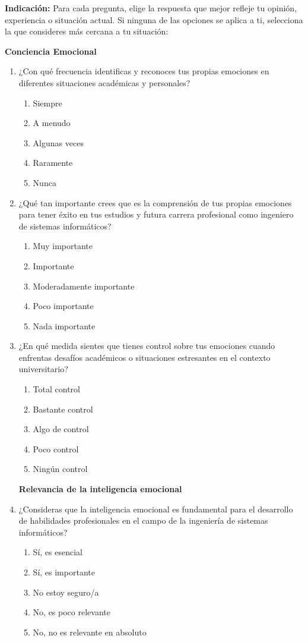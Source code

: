 \documentclass[journal]{IEEEtran}
\begin{document}
\textbf{Indicación:} Para cada pregunta, elige la respuesta que mejor refleje tu opinión, experiencia o situación actual. Si ninguna de las opciones se aplica a ti, selecciona la que consideres más cercana a tu situación:
\begin{center}
	\textbf{Conciencia Emocional}
\end{center}
\begin{enumerate}
	\item ¿Con qué frecuencia identificas y reconoces tus propias emociones en diferentes situaciones académicas y personales?
	\begin{enumerate}
		\item Siempre
		\item A menudo
		\item Algunas veces
		\item Raramente
		\item Nunca
	\end{enumerate}
	
	\item ¿Qué tan importante crees que es la comprensión de tus propias emociones para tener éxito en tus estudios y futura carrera profesional como ingeniero de sistemas informáticos?
	\begin{enumerate}
		\item Muy importante
		\item Importante
		\item Moderadamente importante
		\item Poco importante
		\item Nada importante
	\end{enumerate}
	
	\item ¿En qué medida sientes que tienes control sobre tus emociones cuando enfrentas desafíos académicos o situaciones estresantes en el contexto universitario?
	\begin{enumerate}
		\item Total control
		\item Bastante control
		\item Algo de control
		\item Poco control
		\item Ningún control
	\end{enumerate}
	\begin{center}
	\textbf{Relevancia de la inteligencia emocional}
	\end{center}
	\item ¿Consideras que la inteligencia emocional es fundamental para el desarrollo de habilidades profesionales en el campo de la ingeniería de sistemas informáticos?
	\begin{enumerate}
		\item Sí, es esencial
		\item Sí, es importante
		\item No estoy seguro/a
		\item No, es poco relevante
		\item No, no es relevante en absoluto
	\end{enumerate}
	

\end{enumerate}
\end{document}
